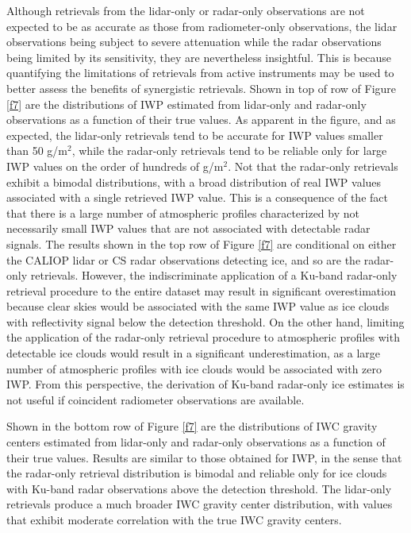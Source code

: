 \documentclass{ametsocV6.1}
\begin{document}
Although retrievals from the lidar-only or radar-only observations are not expected to be as accurate as those from
radiometer-only observations, the lidar observations being subject to severe attenuation while the radar observations
being limited by its sensitivity, they are nevertheless insightful. This is because quantifying the limitations of
retrievals from active instruments may be used to better assess  the benefits of synergistic retrievals.  Shown in
top of row of Figure \ref{f7} are the distributions of IWP estimated from lidar-only and radar-only observations 
as a function of their true values. As apparent in the figure, and as expected, the lidar-only retrievals tend to
be accurate for IWP values smaller than 50 g/m$^2$, while the radar-only retrievals tend to be reliable only for large
IWP values on the order of hundreds of g/m$^2$.  Not that the radar-only retrievals exhibit a bimodal distributions,
with a broad distribution of real IWP values associated with a single retrieved IWP value.  This is a consequence
of the fact that there is a large number of atmospheric profiles characterized by not necessarily small IWP values that
are not associated with detectable radar signals. The results shown in the top row of Figure \ref{f7} are conditional on
either the CALIOP lidar or CS radar observations detecting ice, and so are the radar-only retrievals. However, the 
indiscriminate application of a Ku-band radar-only retrieval procedure to the entire dataset may result in significant
overestimation because clear skies would be associated with the same IWP value as ice clouds with reflectivity signal 
below the detection threshold. On the other hand, limiting the application of the radar-only retrieval procedure to atmospheric profiles
with detectable ice clouds would result in a significant underestimation, as a large number of atmospheric profiles
with ice clouds would be associated with zero IWP.  From this perspective, the derivation of  Ku-band radar-only ice estimates
is not useful if coincident radiometer observations are available.

Shown in the bottom row of Figure \ref{f7} are the distributions of IWC gravity centers
estimated from lidar-only and radar-only observations as a function of their true values. Results are similar to those
obtained for IWP, in the sense that the radar-only retrieval distribution is bimodal and reliable only for ice clouds
with Ku-band radar observations above the detection threshold.
The lidar-only retrievals produce a much broader IWC gravity center distribution, with values that exhibit moderate 
correlation with the true IWC gravity centers.  
\end{document}
